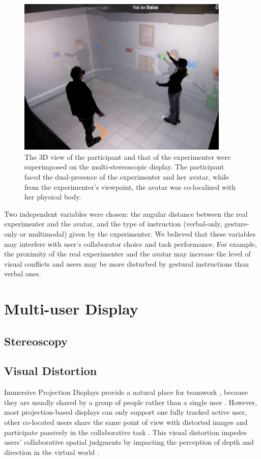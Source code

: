 \begin{figure}[tb]
  \centering
  \includegraphics[width=0.9\textwidth]{figures/ch2/demo}
  \caption{\label{fig:2_demo}The 3D view of the participant and that of the experimenter were superimposed on the multi-stereoscopic display. The participant faced the dual-presence of the experimenter and her avatar, while from the experimenter's viewpoint, the avatar was co-localized with her physical body.}
\end{figure}

Two independent variables were chosen: the angular distance between the real experimenter and the avatar, and the type of instruction (verbal-only, gesture-only or multimodal) given by the experimenter. We believed that these variables may interfere with user's collaborator choice and task performance. For example, the proximity of the real experimenter and the avatar may increase the level of visual conflicts and users may be more disturbed by gestural instructions than verbal ones.

\section{Multi-user Display}
\subsection{Stereoscopy}
\subsection{Visual Distortion}
Immersive Projection Displays provide a natural place for teamwork \citep{Johanson2002IWP}, because they are usually shared by a group of people rather than a single user \citep{Benford1996SST}. However, most projection-based displays can only support one fully tracked active user, other co-located users share the same point of view with distorted images and participate passively in the collaborative task \citep{Bayon2006Multiple}. This visual distortion impedes users' collaborative spatial judgments by impacting the perception of depth and direction in the virtual world \citep{Pollock2012Right}.

